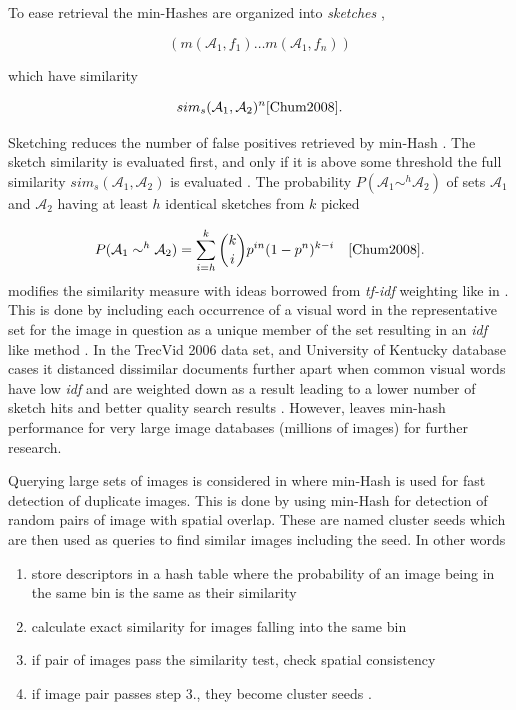 \documentclass[english,12pt,a4paper,pdftex,elec,utf8, table]{aaltothesis}
\begin{document}
To ease retrieval the min-Hashes are organized into \emph{sketches} \cite{Chum2008}, \cite{Broder1997}

\begin{equation}\label{sketch}
(m(\mathcal{A_1},f_1) \ldots m(\mathcal{A_1},f_n))
\end{equation}

which have similarity

\begin{equation}\label{sketchsim}
sim_s(\mathcal{A}_1, \mathcal{A}_2)^n \cite{Chum2008}.
\end{equation}

Sketching reduces the number of false positives retrieved by min-Hash \cite{Chum2008}. The sketch similarity is evaluated first, and only if it is above some threshold the full similarity $sim_s(\mathcal{A}_1, \mathcal{A}_2)$ is evaluated \cite{Chum2008}. The probability $P(\mathcal{A}_1 \sim^h \mathcal{A}_2)$ of sets $\mathcal{A}_1$ and $\mathcal{A}_2$ having at least $h$ identical sketches from $k$ picked

\begin{equation} \label{sketchsimilarityprob}
P(\mathcal{A}_1 \sim^h \mathcal{A}_2) = \sum_{i=h}^k \binom{k}{i} p^{in}(1-p^n)^{k-i} \quad \cite{Chum2008}.
\end{equation}
\cite{Chum2008} modifies the similarity measure with ideas borrowed from \emph{tf-idf} weighting like in \cite{Sivic2003}. This is done by including each occurrence of a visual word in the representative set for the image in question as a unique member of the set resulting in an \emph{idf} like method \cite{Chum2010}. In the TrecVid 2006 data set, and University of Kentucky database cases it distanced dissimilar documents further apart when common visual words have low \emph{idf} and are weighted down as a result leading to a lower number of sketch hits and better quality search results \cite{Chum2008}. However, \cite{Chum2008} leaves min-hash performance for very large image databases (millions of images) for further research.

Querying large sets of images is considered in \cite{Chum2010} where min-Hash is used for fast detection of duplicate images. This is done by using min-Hash for detection of random pairs of image with spatial overlap. These are named cluster seeds which are then used as queries to find similar images including the seed. In other words

\begin{enumerate}
\item store descriptors in a hash table where the probability of an image being in the same bin is the same as their similarity
\item calculate exact similarity for images falling into the same bin
\item if pair of images pass the similarity test, check spatial consistency
\item if image pair passes step 3., they become cluster seeds \cite{Chum2010}.
\end{enumerate}
\end{document}

